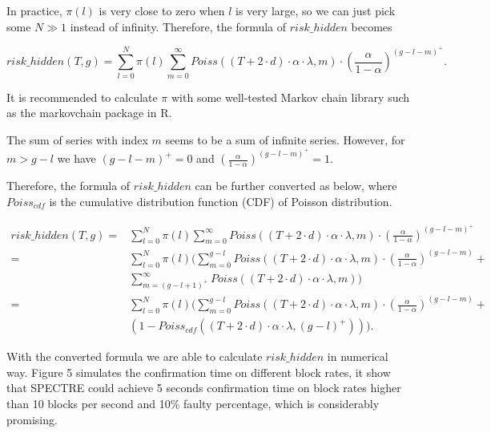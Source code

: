 \documentclass[a4paper,11pt]{article}
\begin{document}
In practice, $\pi(l)$ is very close to zero when $l$ is very large, so we can
just pick some $N \gg 1$ instead of infinity. Therefore, the formula of
$risk\_hidden$ becomes

$$
risk\_hidden(T,g) = \sum_{l=0}^{N} \pi(l) \sum_{m=0}^{\infty} Poiss((T + 2 \cdot
d) \cdot \alpha \cdot \lambda, m) \cdot \left(\frac{\alpha}{1-\alpha}\right)^{(g
- l - m)^+}.
$$

It is recommended to calculate $\pi$ with some well-tested Markov chain library such
as the markovchain package in R.

The sum of series with index $m$ seems to be a sum of infinite series. However,
for $m > g - l$ we have $(g - l - m)^+ = 0$ and
$\left(\frac{\alpha}{1-\alpha}\right)^{(g - l - m)^+} = 1$.

Therefore, the formula of $risk\_hidden$ can be further converted as below,
where $Poiss_{cdf}$ is the cumulative distribution function (CDF) of Poisson
distribution.

\begin{align*}
risk\_hidden(T,g)
=& \sum_{l=0}^{N}\pi(l)\sum_{m=0}^{\infty}Poiss((T+2 \cdot d) \cdot \alpha \cdot \lambda, m) \cdot (\frac{\alpha}{1-\alpha})^{(g-l-m)^+} \\
=& \sum_{l=0}^{N}\pi(l) (\sum_{m=0}^{g-l}Poiss((T+2 \cdot d) \cdot \alpha
	\cdot \lambda, m) \cdot (\frac{\alpha}{1-\alpha})^{(g-l-m)} + \\
& \sum_{m=(g-l+1)^+}^{\infty}Poiss((T+2 \cdot d) \cdot \alpha \cdot \lambda, m)) \\
=& \sum_{l=0}^{N}\pi(l) ( \sum_{m=0}^{g-l}Poiss((T+2 \cdot d) \cdot
	\alpha \cdot \lambda, m) \cdot (\frac{\alpha}{1-\alpha})^{(g-l-m)} + \\
& (1 - Poiss_{cdf} ((T+2 \cdot d) \cdot \alpha \cdot \lambda, (g-l)^+))).
\end{align*}

With the converted formula we are able to calculate $risk\_hidden$ in numerical way. Figure 5 simulates the confirmation time on different block rates, it show that SPECTRE could achieve 5 seconds confirmation time on block rates higher than 10 blocks per second and 10\% faulty percentage, which is considerably promising.
\end{document}
